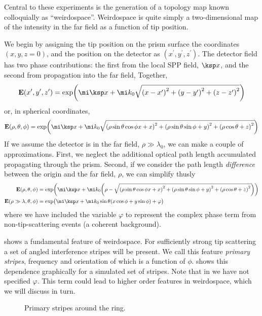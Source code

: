 Central to these experiments is the generation of a topology map known
colloquially as ``weirdospace''.  Weirdospace is quite simply
a two-dimensional map of the intensity in the far field as a function of tip
position.

We begin by assigning the tip position on the prism surface the coordinates
$(x,y,z=0)$, and the position on the detector as
$(x^\prime,y^\prime,z^\prime)$.  The detector field has two phase
contributions: the first from the local SPP field, $\ksp x$, and the second
from propagation into the far field, Together,
\begin{equation}
\mathbf{E}(x^\prime,y^\prime,z^\prime) = \exp\!{\left( \mi\ksp x + \mi k_0\sqrt{{(x-x^\prime)}^2+{(y-y^\prime)}^2+ {(z-z^\prime)}^2 } \right)}
\end{equation}
or, in spherical coordinates,
\begin{equation}
\mathbf{E}(\rho,\theta,\phi) = \exp\!{\left( \mi\ksp x + %
\mi k_0\sqrt{{(\rho\sin\theta\cos\phi x+x)}^2+{(\rho\sin\theta\sin\phi+y)}^2+{(\rho\cos\theta+z)}^2 } \right)}
\label{eqn:dingusthusly}
\end{equation}
If we assume the detector is in the far field, $\rho\gg\lambda_0$, we can
make a couple of approximations.  First, we neglect the additional optical
path length accumulated propagating through the prism.  Second, if we
consider the path length \textit{difference} between the origin and the far field,
$\rho$, we can simplify  thusly
\begin{align}
				\mathbf{E}(\rho,\theta,\phi) &= \exp\!{\left( \mi\ksp x + %
				\mi k_0{\left(\rho-\sqrt{{(\rho\sin\theta\cos\phi x+x)}^2+{(\rho\sin\theta\sin\phi+y)}^2+{(\rho\cos\theta+z)}^2
				}\right)} \right)}\\
				\mathbf{E}(\rho\gg\lambda,\theta,\phi) &= \exp\!{\big( \mi \ksp x
				+ \mi k_0 \sin\theta {\left(x\cos\phi+y\sin\phi\right)}
				+ \varphi\big)}
	\label{eqn:primarystripes}
\end{align}
where we have included the variable $\varphi$ to represent the complex phase term
from non-tip-scattering events (a coherent background).

 shows a fundamental feature of weirdospace.
For sufficiently strong tip scattering a set of angled interference stripes
will be present.  We call this feature \textit{primary stripes},
frequency and orientation of which is a function of $\phi$.
 shows this
dependence graphically for a simulated set of stripes.  Note that in
 we have not specified $\varphi$.  This term
could lead to higher order features in weirdospace, which we will discuss
in turn.
\begin{figure}
\centering
\caption{Primary stripes around the ring.}
\label{fig:primarystripes}
\end{figure}
